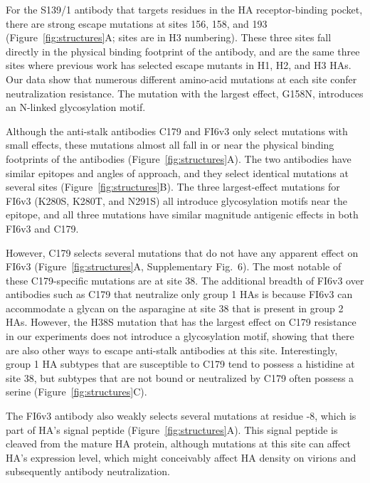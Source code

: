 \documentclass[11pt]{article}
\begin{document}
For the S139/1 antibody that targets residues in the HA receptor-binding pocket, there are strong escape mutations at sites 156, 158, and 193 (Figure~\ref{fig:structures}A; sites are in H3 numbering). 
These three sites fall directly in the physical binding footprint of the antibody\cite{lee2012heterosubtypic}, and are the same three sites where previous work has selected escape mutants in H1, H2, and H3 HAs\cite{yoshida2009cross}. 
Our data show that numerous different amino-acid mutations at each site confer neutralization resistance.
The mutation with the largest effect, G158N, introduces an N-linked glycosylation motif.

Although the anti-stalk antibodies C179 and FI6v3 only select mutations with small effects, these mutations almost all fall in or near the physical binding footprints of the antibodies (Figure~\ref{fig:structures}A).
The two antibodies have similar epitopes and angles of approach\cite{dreyfus2013structure}, and they select identical mutations at several sites (Figure~\ref{fig:structures}B). 
The three largest-effect mutations for FI6v3 (K280S, K280T, and N291S) all introduce glycosylation motifs near the epitope, and all three mutations have similar magnitude antigenic effects in both FI6v3 and C179.

However, C179 selects several mutations that do not have any apparent effect on FI6v3 (Figure~\ref{fig:structures}A, Supplementary Fig.~6).
The most notable of these C179-specific mutations are at site 38.
The additional breadth of FI6v3 over antibodies such as C179 that neutralize only group 1 HAs is because FI6v3 can accommodate a glycan on the asparagine at site 38 that is present in group 2 HAs\cite{corti2011neutralizing,sui2009structural,ekiert2009antibody}. 
However, the H38S mutation that has the largest effect on C179 resistance in our experiments does not introduce a glycosylation motif, showing that there are also other ways to escape anti-stalk antibodies at this site.
Interestingly, group 1 HA subtypes that are susceptible to C179 tend to possess a histidine at site 38, but subtypes that are not bound or neutralized by C179 often possess a serine (Figure~\ref{fig:structures}C). 

The FI6v3 antibody also weakly selects several mutations at residue -8, which is part of HA's signal peptide (Figure~\ref{fig:structures}A). 
This signal peptide is cleaved from the mature HA protein\cite{daniels2003n,burke2014recommended}, although mutations at this site can affect HA's expression level\cite{nordholm2017translational}, which might conceivably affect HA density on virions and subsequently antibody neutralization\cite{corti2011neutralizing,joyce2016vaccine}.
\end{document}
